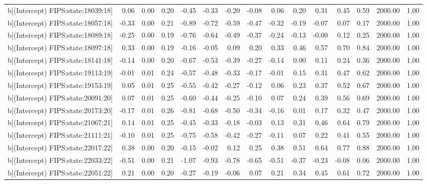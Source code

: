 \begin{table}[ht]
\begin{tabular}{rrrrrrrrrrrrrrr}
  b[(Intercept) FIPS:state:18039:18] & 0.06 & 0.00 & 0.20 & -0.45 & -0.33 & -0.20 & -0.08 & 0.06 & 0.20 & 0.31 & 0.45 & 0.59 & 2000.00 & 1.00 \\ 
  b[(Intercept) FIPS:state:18057:18] & -0.33 & 0.00 & 0.21 & -0.89 & -0.72 & -0.59 & -0.47 & -0.32 & -0.19 & -0.07 & 0.07 & 0.17 & 2000.00 & 1.00 \\ 
  b[(Intercept) FIPS:state:18089:18] & -0.25 & 0.00 & 0.19 & -0.76 & -0.64 & -0.49 & -0.37 & -0.24 & -0.13 & -0.00 & 0.12 & 0.25 & 2000.00 & 1.00 \\ 
  b[(Intercept) FIPS:state:18097:18] & 0.33 & 0.00 & 0.19 & -0.16 & -0.05 & 0.09 & 0.20 & 0.33 & 0.46 & 0.57 & 0.70 & 0.84 & 2000.00 & 1.00 \\ 
  b[(Intercept) FIPS:state:18141:18] & -0.14 & 0.00 & 0.20 & -0.67 & -0.53 & -0.39 & -0.27 & -0.14 & 0.00 & 0.11 & 0.24 & 0.36 & 2000.00 & 1.00 \\ 
  b[(Intercept) FIPS:state:19113:19] & -0.01 & 0.01 & 0.24 & -0.57 & -0.48 & -0.33 & -0.17 & -0.01 & 0.15 & 0.31 & 0.47 & 0.62 & 2000.00 & 1.00 \\ 
  b[(Intercept) FIPS:state:19153:19] & 0.05 & 0.01 & 0.25 & -0.55 & -0.42 & -0.27 & -0.12 & 0.06 & 0.23 & 0.37 & 0.52 & 0.67 & 2000.00 & 1.00 \\ 
  b[(Intercept) FIPS:state:20091:20] & 0.07 & 0.01 & 0.25 & -0.60 & -0.44 & -0.25 & -0.10 & 0.07 & 0.24 & 0.39 & 0.56 & 0.69 & 2000.00 & 1.00 \\ 
  b[(Intercept) FIPS:state:20173:20] & -0.17 & 0.01 & 0.26 & -0.81 & -0.68 & -0.50 & -0.34 & -0.16 & 0.01 & 0.17 & 0.32 & 0.47 & 2000.00 & 1.00 \\ 
  b[(Intercept) FIPS:state:21067:21] & 0.14 & 0.01 & 0.25 & -0.45 & -0.33 & -0.18 & -0.03 & 0.13 & 0.31 & 0.46 & 0.64 & 0.79 & 2000.00 & 1.00 \\ 
  b[(Intercept) FIPS:state:21111:21] & -0.10 & 0.01 & 0.25 & -0.75 & -0.58 & -0.42 & -0.27 & -0.11 & 0.07 & 0.22 & 0.41 & 0.55 & 2000.00 & 1.00 \\ 
  b[(Intercept) FIPS:state:22017:22] & 0.38 & 0.00 & 0.20 & -0.15 & -0.02 & 0.12 & 0.25 & 0.38 & 0.51 & 0.64 & 0.77 & 0.88 & 2000.00 & 1.00 \\ 
  b[(Intercept) FIPS:state:22033:22] & -0.51 & 0.00 & 0.21 & -1.07 & -0.93 & -0.78 & -0.65 & -0.51 & -0.37 & -0.23 & -0.08 & 0.06 & 2000.00 & 1.00 \\ 
  b[(Intercept) FIPS:state:22051:22] & 0.21 & 0.00 & 0.20 & -0.27 & -0.19 & -0.06 & 0.07 & 0.21 & 0.34 & 0.45 & 0.61 & 0.72 & 2000.00 & 1.00 \\ 

\end{tabular}
\end{table}
